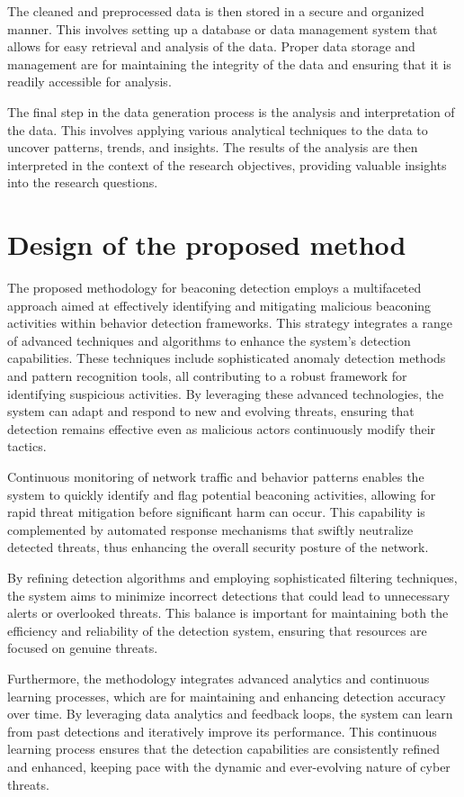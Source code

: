 The cleaned and preprocessed data is then stored in a secure and organized manner. This involves setting up a database or data management system that allows for easy retrieval and analysis of the data. Proper data storage and management are  for maintaining the integrity of the data and ensuring that it is readily accessible for analysis.

The final step in the data generation process is the analysis and interpretation of the data. This involves applying various analytical techniques to the data to uncover patterns, trends, and insights. The results of the analysis are then interpreted in the context of the research objectives, providing valuable insights into the research questions.

\section{Design of the proposed method}
The proposed methodology for beaconing detection employs a multifaceted approach aimed at effectively identifying and mitigating malicious beaconing activities within behavior detection frameworks. This strategy integrates a range of advanced techniques and algorithms to enhance the system's detection capabilities. These techniques include sophisticated anomaly detection methods and pattern recognition tools, all contributing to a robust framework for identifying suspicious activities. By leveraging these advanced technologies, the system can adapt and respond to new and evolving threats, ensuring that detection remains effective even as malicious actors continuously modify their tactics.

Continuous monitoring of network traffic and behavior patterns enables the system to quickly identify and flag potential beaconing activities, allowing for rapid threat mitigation before significant harm can occur. This capability is complemented by automated response mechanisms that swiftly neutralize detected threats, thus enhancing the overall security posture of the network.

By refining detection algorithms and employing sophisticated filtering techniques, the system aims to minimize incorrect detections that could lead to unnecessary alerts or overlooked threats. This balance is important for maintaining both the efficiency and reliability of the detection system, ensuring that resources are focused on genuine threats.

Furthermore, the methodology integrates advanced analytics and continuous learning processes, which are for maintaining and enhancing detection accuracy over time. By leveraging data analytics and feedback loops, the system can learn from past detections and iteratively improve its performance. This continuous learning process ensures that the detection capabilities are consistently refined and enhanced, keeping pace with the dynamic and ever-evolving nature of cyber threats.

